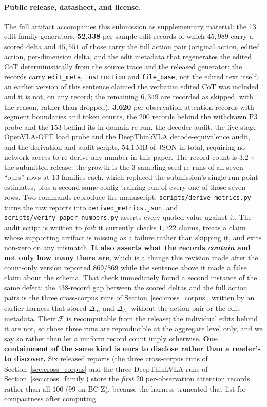 \documentclass{article}
\begin{document}
\paragraph{Public release, datasheet, and license.} The full artifact accompanies this submission as supplementary material: the 13 edit-family generators, \textbf{52{,}338} per-sample edit records of which $45{,}989$ carry a scored delta and $45{,}551$ of those carry the full action pair (original action, edited action, per-dimension delta, and the edit metadata that regenerates the edited CoT deterministically from the source trace and the released generator: the records carry \texttt{edit\_meta}, \texttt{instruction} and \texttt{file\_base}, not the edited text itself; an earlier version of this sentence claimed the verbatim edited CoT was included and it is not, on any record; the remaining $6{,}349$ are recorded as skipped, with the reason, rather than dropped), \textbf{3{,}620} per-observation attention records with segment boundaries and token counts, the $200$ records behind the withdrawn P3 probe and the $153$ behind its in-domain re-run, the decoder audit, the five-stage OpenVLA-OFT load probe and the DeepThinkVLA decode-equivalence audit, and the derivation and audit scripts, $54.1$\,MB of JSON in total, requiring no network access to re-derive any number in this paper. The record count is $3.2\times$ the submitted release: the growth is the 3-sampling-seed re-runs of all seven ``ours'' rows at 13 families each, which replaced the submission's single-run point estimates, plus a second same-config training run of every one of those seven rows. Two commands reproduce the manuscript: \texttt{scripts/derive\_metrics.py} turns the raw reports into \texttt{derived\_metrics.json}, and \texttt{scripts/verify\_paper\_numbers.py} asserts every quoted value against it. The audit script is written to \emph{fail}: it currently checks $1{,}722$ claims, treats a claim whose supporting artifact is missing as a failure rather than skipping it, and exits non-zero on any mismatch. \textbf{It also asserts what the records \emph{contain} and not only how many there are}, which is a change this revision made after the count-only version reported $869/869$ while the sentence above it made a false claim about the schema. That check immediately found a second instance of the same defect: the $438$-record gap between the scored deltas and the full action pairs is the three cross-corpus runs of Section~\ref{sec:cross_corpus}, written by an earlier harness that stored $\Delta_\infty$ and $\Delta_{L_1}$ without the action pair or the edit metadata. Their $\mathcal{F}$ is recomputable from the release; the individual edits behind it are not, so those three runs are reproducible at the aggregate level only, and we say so rather than let a uniform record count imply otherwise. \textbf{One containment of the same kind is ours to disclose rather than a reader's to discover.} Six released reports (the three cross-corpus runs of Section~\ref{sec:cross_corpus} and the three DeepThinkVLA runs of Section~\ref{sec:cross_family}) store the \emph{first $20$} per-observation attention records rather than all $100$ ($99$ on BC-Z), because the harness truncated that list for compactness after computing 
\end{document}
